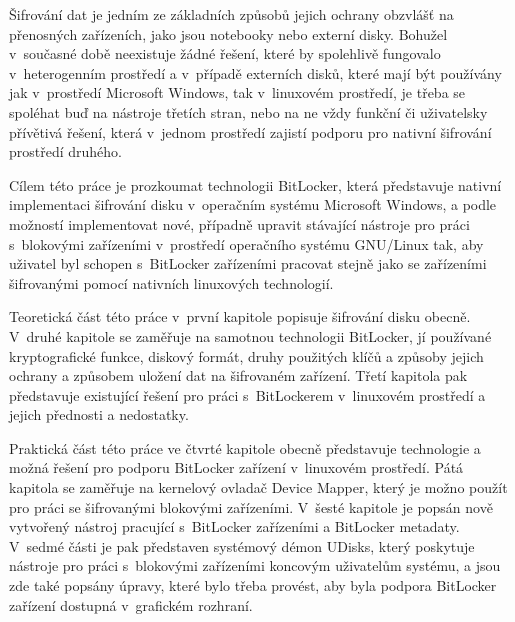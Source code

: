 

Šifrování dat je jedním ze základních způsobů jejich ochrany obzvlášť na přenosných zařízeních, jako jsou notebooky nebo externí disky. Bohužel v~současné době neexistuje žádné řešení, které by spolehlivě fungovalo v~heterogenním prostředí a v~případě externích disků, které mají být používány jak v~prostředí Microsoft Windows, tak v~linuxovém prostředí, je třeba se spoléhat buď na nástroje třetích stran, nebo na ne vždy funkční či uživatelsky přívětivá řešení, která v~jednom prostředí zajistí podporu pro nativní šifrování prostředí druhého.

Cílem této práce je prozkoumat technologii BitLocker, která představuje nativní implementaci šifrování disku v~operačním systému Microsoft Windows, a podle možností implementovat nové, případně upravit stávající nástroje pro práci s~blokovými zařízeními v~prostředí operačního systému GNU/Linux tak, aby uživatel byl schopen s~BitLocker zařízeními pracovat stejně jako se zařízeními šifrovanými pomocí nativních linuxových technologií.

Teoretická část této práce v~první kapitole popisuje šifrování disku obecně. V~druhé kapitole se zaměřuje na samotnou technologii BitLocker, jí používané kryptografické funkce, diskový formát, druhy použitých klíčů a způsoby jejich ochrany a způsobem uložení dat na šifrovaném zařízení. Třetí kapitola pak představuje existující řešení pro práci s~BitLockerem v~linuxovém prostředí a jejich přednosti a nedostatky.

Praktická část této práce ve čtvrté kapitole obecně představuje technologie a možná řešení pro podporu BitLocker zařízení v~linuxovém prostředí. Pátá kapitola se zaměřuje na kernelový ovladač Device Mapper, který je možno použít pro práci se šifrovanými blokovými zařízeními. V~šesté kapitole je popsán nově vytvořený nástroj pracující s~BitLocker zařízeními a BitLocker metadaty. V~sedmé části je pak představen systémový démon UDisks, který poskytuje nástroje pro práci s~blokovými zařízeními koncovým uživatelům systému, a jsou zde také popsány úpravy, které bylo třeba provést, aby byla podpora BitLocker zařízení dostupná v~grafickém rozhraní.




